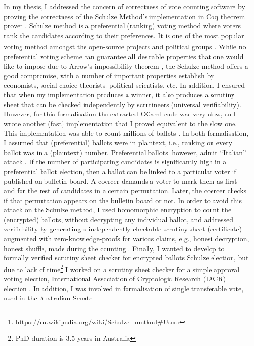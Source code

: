 \documentclass[a4paper]{article}
\begin{document}
In my thesis, I addressed the concern of correctness of vote counting 
software by proving the correctness of the Schulze Method's implementation in 
Coq theorem prover \cite{10.1007/978-3-319-66107-0_26}.
Schulze method is a preferential (ranking) voting method where voters rank the 
candidates according to their preferences. It is one of the most popular voting method amongst the open-source projects and 
political groups\footnote{\url{https://en.wikipedia.org/wiki/Schulze_method#Users}}.
While no preferential voting scheme can guarantee all
desirable properties that one would like to impose due to Arrow's impossibility theorem \cite{arrow1950difficulty}, 
the Schulze method offers a good compromise, with a number of important properties establish by economists, 
social choice theorists, political scientists, etc. In addition, I ensured that when my implementation
produces a winner, it also produces a scrutiny sheet that can be checked independently by 
scrutineers (universal verifiability).  However, for this formalisation the extracted OCaml code was 
very slow, so I wrote another (fast) implementation 
that I proved equivalent to the slow one. This implementation was able to count millions of ballots \cite{bennett2017no}.
In both formalisation, I assumed that (preferential) ballots were in plaintext, i.e., ranking on 
every ballot was in a (plaintext) number.  Preferential ballots, 
however, admit ``Italian'' attack \cite{Otten, Benaloh:2009:SSC}. 
If the number of participating candidates is significantly high in 
a preferential ballot election,
then a ballot can be linked to a particular voter if published on bulletin board.
A coercer demands a voter to mark them as first and for the rest of candidates
in a certain permutation. Later, the coercer checks if that permutation appears 
on the bulletin board or not. In order to
avoid this attack on the Schulze method, I used homomorphic encryption to count the (encrypted) ballots, without decrypting 
any individual ballot, and addressed verifiability by generating a independently checkable scrutiny sheet (certificate) 
augmented with zero-knowledge-proofs for various claims, e.g., honest decryption, honest shuffle,  
made during the counting \cite{10.1007/978-3-030-41600-3_4}. Finally, I wanted to develop to formally 
verified scrutiny sheet checker for encrypted ballots Schulze election, but due to lack of 
time\footnote{PhD duration is 3.5 years in Australia} I worked on a scrutiny sheet checker for a simple approval voting election,
International Association of Cryptologic Research (IACR) election \cite{10.1145/3319535.3354247}.
In addition, I was involved in formalisation of single transferable vote, used in the Australian Senate
\cite{10.1007/978-3-030-00419-4_4}.
\end{document}
